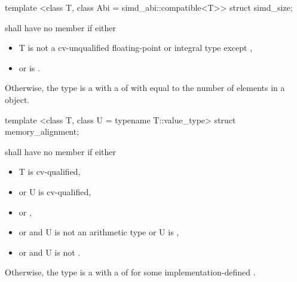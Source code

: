 \begin{itemdecl}
template <class T, class Abi = simd_abi::compatible<T>> struct simd_size;
\end{itemdecl}
\begin{itemdescr}
  \pnum\label{simd_size}%
   shall have no member  if either
  \begin{itemize}
    \item \type T is not a cv-unqualified floating-point or integral type except \bool,
    \item or  is \false.
  \end{itemize}

  \pnum
  Otherwise, the type  is a \BinaryTypeTrait with a \BaseCharacteristic of  with  equal to the number of elements in a \simd[<T, Abi>] object.

\end{itemdescr}

\begin{itemdecl}
template <class T, class U = typename T::value_type> struct memory_alignment;
\end{itemdecl}
\begin{itemdescr}
  \pnum
   shall have no member  if either
  \begin{itemize}
    \item \type T is cv-qualified,
    \item or \type U is cv-qualified,
    \item or ,
    \item or  and \type U is not an arithmetic type or \type U is \bool,
    \item or  and \type U is not \bool.
  \end{itemize}

  \pnum
  Otherwise, the type  is a \BinaryTypeTrait with a \BaseCharacteristic of  for some implementation-defined .
\end{itemdescr}

